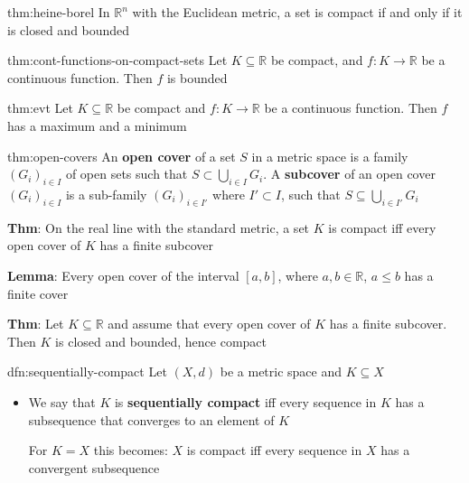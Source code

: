 \documentclass[landscape, 8pt]{extarticle}
\begin{document}
\begin{multicols}{3}
\begin{thm}{thm:heine-borel}{}
    \longrule{0.08ex}
    In $\mathbb{R}^{n}$ with the Euclidean metric, a set is compact if and only if it is closed and bounded
\end{thm}

\vspace{-5pt}
\begin{thm}{thm:cont-functions-on-compact-sets}{}
    Let $K \subseteq \mathbb{R}$ be compact, and $f : K \to \mathbb{R}$ be a continuous function. Then $f$ is bounded
\end{thm}

\begin{thm}{thm:evt}{}
    Let $K \subseteq \mathbb{R}$ be compact and $f : K \to \mathbb{R}$ be a continuous function. Then $f$ has a maximum and a minimum
\end{thm}

\begin{thm}{thm:open-covers}{}
    An \textbf{open cover} of a set $S$ in a metric space is a family $(G_{i})_{i\in I}$ of open sets such that $S \subset \bigcup\limits_{i \in I} G_{i}$. A \textbf{subcover} of an open cover $(G_{i})_{i\in I}$ is a sub-family $(G_{i})_{i\in I'}$ where $I' \subset I$, such that $S \subseteq \bigcup_{i\in I'} G_{i}$

    \longrule{0.08ex}
    \textbf{Thm}: On the real line with the standard metric, a set $K$ is compact iff every open cover of $K$ has a finite subcover

    \longrule{0.08ex}
    \textbf{Lemma}: Every open cover of the interval $[a, b]$, where $a, b\in \mathbb{R}$, $a \le b$ has a finite cover

    \longrule{0.08ex}
    \textbf{Thm}: Let $K \subseteq \mathbb{R}$ and assume that every open cover of $K$ has a finite subcover. Then $K$ is closed and bounded, hence compact
\end{thm}

\begin{dfn}{dfn:sequentially-compact}{}
    Let $(X, d)$ be a metric space and $K \subseteq X$
    \begin{itemize}[leftmargin=*]
        \item We say that $K$ is \textbf{sequentially compact} iff every sequence in $K$ has a subsequence that converges to an element of $K$
        
            For $K = X$ this becomes: $X$ is compact iff every sequence in $X$ has a convergent subsequence


\end{itemize}
\end{dfn}
\end{multicols}
\end{document}
